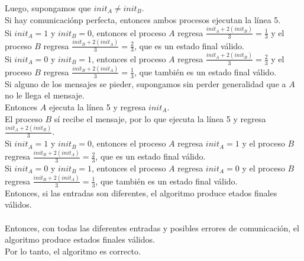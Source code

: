 \documentclass[12pt,a4paper]{report}
\begin{document}
\begin{enumerate}
{		Luego, supongamos que $init_A \ne init_B$.\\
		Si hay comunicaciónp perfecta, entonces ambos procesos ejecutan la línea 5.\\
		Si $init_A = 1$ y $init_B = 0$, entonces el proceso $A$ regresa
		$\frac{init_A + 2(init_B)}{3} = \frac{1}{3}$ y el proceso $B$ regresa
		$\frac{init_B + 2(init_A)}{3} = \frac{2}{3}$, que es un estado final válido.\\
		Si $init_A = 0$ y $init_B = 1$, entonces el proceso $A$ regresa
		$\frac{init_A + 2(init_B)}{3} = \frac{2}{3}$ y el proceso $B$ regresa
		$\frac{init_B + 2(init_A)}{3} = \frac{1}{3}$, que también es un estado final válido.\\
		Si alguno de los mensajes se pieder, supongamos sin perder generalidad que a $A$
		no le llega el mensaje.\\
		Entonces $A$ ejecuta la línea 5 y regresa $init_A$.\\
		El proceso $B$ sí recibe el mensaje, por lo que ejecuta la línea 5 y regresa
		$\frac{init_A + 2 (init_B)}{3}$.\\
		Si $init_A = 1$ y $init_B = 0$, entonces el proceso $A$ regresa $init_A = 1$
		y el proceso $B$ regresa $\frac{init_B + 2(init_A)}{3} = \frac{2}{3}$,
		que es un estado final válido.\\
		Si $init_A = 0$ y $init_B = 1$, entonces el proceso $A$ regresa $init_A = 0$
		y el proceso $B$ regresa $\frac{init_B + 2(init_A)}{3} = \frac{1}{3}$,
		que también es un estado final válido.\\
		Entonces, si las entradas son diferentes, el algoritmo produce etados finales
		válidos.\\\\
		Entonces, con todas las diferentes entradas y posibles errores de comunicación,
		el algoritmo produce estados finales válidos.\\
		Por lo tanto, el algoritmo es correcto.\\\\
		}
	\end{enumerate}
\end{document}
